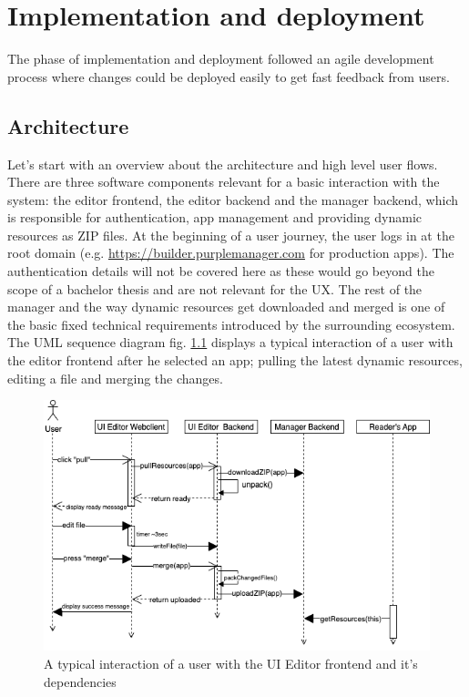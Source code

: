 
%
\chapter{Implementation and deployment}
\label{chap:impl} 

The phase of implementation and deployment followed an agile development process where changes could be deployed easily to get fast feedback from users.


\section{Architecture}

Let's start with an overview about the architecture and high level user flows.
There are three software components relevant for a basic interaction with the system: the editor frontend, the editor backend and the \Gls{manager} backend, which is responsible for
authentication, app management and providing dynamic resources as ZIP files.
At the beginning of a user journey, the user logs in at the root domain (e.g. \url{https://builder.purplemanager.com} for production apps).
The authentication details will not be covered here as these would go beyond the scope of a bachelor thesis and are not relevant for the UX.
The \Gls{rest} of the \Gls{manager} and the way dynamic resources get downloaded and merged is one of the basic fixed technical requirements introduced by the surrounding ecosystem.
\\
The UML sequence diagram fig. \ref{fig:userflow} displays a typical interaction of a user with the editor frontend after he selected an app; pulling the latest dynamic resources, editing a file and merging the changes.
\begin{figure}[h!]
  \includegraphics[width=\textwidth]{pics/user-flow.uml.drawio.png}
  \caption{A typical interaction of a user with the UI Editor frontend and it's dependencies}
  \label{fig:userflow}
\end{figure}
\pagebreak
